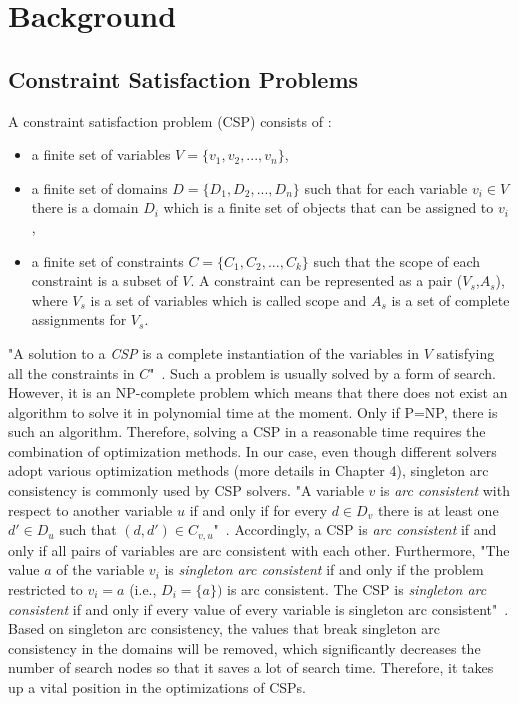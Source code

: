\chapter{Background}
\label{cha:background}
\section{Constraint Satisfaction Problems}
A constraint satisfaction problem (CSP) consists of \cite{r18}:
\begin{itemize}
  \item a finite set of variables $V = \{{v_{1}, v_{2},..., v_{n}}\}$,
  \item a finite set of domains $D = \{D_{1}, D_{2},..., D_{n}\}$ such that for each
variable $v_{i} \in V$ there is a domain $D_{i}$ which is a finite set of objects that can be assigned to $v_{i}$,
  \item a finite set of constraints $C = \{C_{1}, C_{2},..., C_{k}\}$ such that the scope of each constraint is a subset of $V$. A constraint can be represented as a pair ($V_{s}$,$A_{s}$), where $V_{s}$ is a set of variables which is called scope and $A_{s}$ is a set of complete assignments for $V_{s}$.
\end{itemize}
"A solution to a \emph{CSP} is a complete instantiation of the variables in $V$ satisfying all the constraints in $C$"~\cite{r18}. Such a problem is usually solved by a form of search. However, it is an NP-complete problem which means that there does not exist an algorithm to solve it in polynomial time at the moment. Only if P=NP, there is such an algorithm. Therefore, solving a CSP in a reasonable time requires the combination of optimization methods. In our case, even though different solvers adopt various optimization methods (more details in Chapter 4), singleton arc consistency is commonly used by CSP solvers. "A variable $v$ is \emph{arc consistent} with respect to another variable $u$ if and only if for every $d \in D_{v}$ there is at least one $d'\in D_{u}$ such that $(d,d')\in C_{v,u}$"~\cite{r7}. Accordingly, a CSP is \emph{arc consistent} if and only if all pairs of variables are arc consistent with each other. Furthermore, "The value $a$ of the variable $v_{i}$ is \emph{singleton arc consistent} if and only if the problem restricted to $v_{i}=a$ (i.e., $D_{i}=\{a\})$ is arc consistent. The CSP is \emph{singleton arc consistent} if and only if every value of every variable is singleton arc consistent"~\cite{r30}.
Based on singleton arc consistency, the values that break singleton arc consistency in the domains will be removed, which significantly decreases the number of search nodes so that it saves a lot of search time. Therefore, it takes up a vital position in the optimizations of CSPs. 
